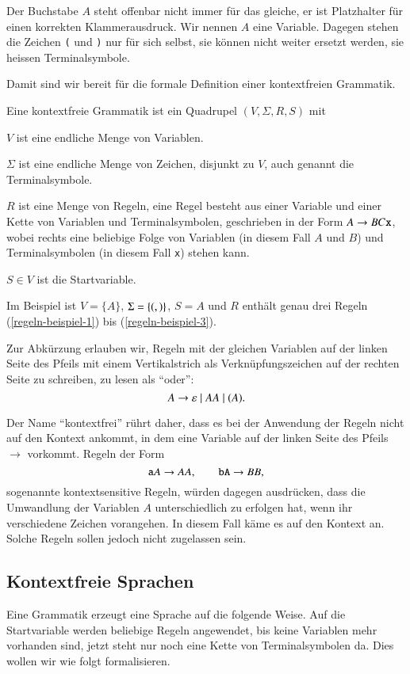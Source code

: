 Der Buchstabe $A$ steht offenbar nicht immer für das gleiche, 
er ist Platzhalter für einen korrekten Klammerausdruck. Wir nennen
$A$ eine Variable.
Dagegen stehen die Zeichen {\tt (} und {\tt )} nur für sich selbst, sie
können nicht weiter ersetzt werden, sie heissen Terminalsymbole.

Damit sind wir bereit für die formale Definition einer kontextfreien
Grammatik.
\begin{definition}
%
Eine kontextfreie Grammatik ist ein Quadrupel $(V,\Sigma,R,S)$ mit
\begin{compactenum}
%
\item $V$ ist eine endliche Menge von Variablen.
%
\item $\Sigma$ ist eine endliche Menge von Zeichen, disjunkt zu $V$,
auch genannt die Terminalsymbole.
\item $R$ ist eine Menge von Regeln, eine Regel besteht aus einer
Variable und einer Kette von Variablen und Terminalsymbolen, geschrieben
in der Form $A\to BC{\tt x}$, wobei rechts eine beliebige Folge von
Variablen (in diesem Fall $A$ und $B$) und Terminalsymbolen (in diesem Fall
\texttt{x}) stehen kann.
%
\item $S\in V$ ist die Startvariable.
%
\end{compactenum}
\end{definition}
Im Beispiel ist $V=\{A\}$, $\Sigma=\{{\tt (},{\tt )}\}$, $S=A$ und
$R$ enthält genau drei Regeln (\ref{regeln-beispiel-1}) bis
(\ref{regeln-beispiel-3}).

Zur Abkürzung erlauben wir, Regeln mit der gleichen Variablen
auf der linken Seite des Pfeils mit einem Vertikalstrich als
Verknüpfungszeichen auf der rechten Seite zu schreiben, zu lesen
als ``oder'':
\[
A \to \varepsilon\;|\; AA\;|\; {\tt (}A{\tt )}.
\]

Der Name ``kontextfrei'' rührt daher, dass es bei der Anwendung
der Regeln nicht auf den Kontext ankommt, in dem eine Variable
auf der linken Seite des Pfeils~$\rightarrow$ vorkommt. Regeln der
Form 
\[
{\tt a}A\to AA, \qquad {\tt bA}\to BB,
\]
sogenannte kontextsensitive Regeln,
%
würden dagegen ausdrücken, dass die Umwandlung der Variablen $A$
unterschiedlich zu erfolgen hat, wenn ihr verschiedene Zeichen
vorangehen. In diesem Fall käme es auf den Kontext an. Solche
Regeln sollen jedoch nicht zugelassen sein.

\subsection{Kontextfreie Sprachen}
Eine Grammatik erzeugt eine Sprache auf die folgende Weise.
Auf die Startvariable werden beliebige Regeln angewendet,
bis keine Variablen mehr vorhanden sind, jetzt steht nur noch
eine Kette von Terminalsymbolen da. Dies wollen wir wie folgt
formalisieren.

